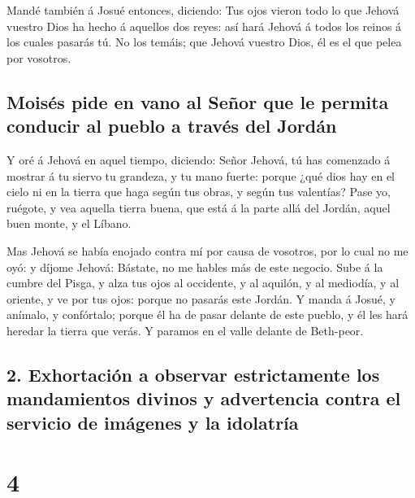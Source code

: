  Mandé también á Josué entonces, diciendo: Tus ojos
vieron todo lo que Jehová vuestro Dios ha hecho á aquellos dos reyes:
así hará Jehová á todos los reinos á los cuales pasarás tú.
 No los temáis; que Jehová vuestro Dios, él es el que
pelea por vosotros.

\hypertarget{moisuxe9s-pide-en-vano-al-seuxf1or-que-le-permita-conducir-al-pueblo-a-travuxe9s-del-jorduxe1n}{%
\subsection{Moisés pide en vano al Señor que le permita conducir al
pueblo a través del
Jordán}\label{moisuxe9s-pide-en-vano-al-seuxf1or-que-le-permita-conducir-al-pueblo-a-travuxe9s-del-jorduxe1n}}

 Y oré á Jehová en aquel tiempo, diciendo:
 Señor Jehová, tú has comenzado á mostrar á tu siervo tu
grandeza, y tu mano fuerte: porque ¿qué dios hay en el cielo ni en la
tierra que haga según tus obras, y según tus valentías? 
Pase yo, ruégote, y vea aquella tierra buena, que está á la parte allá
del Jordán, aquel buen monte, y el Líbano.

 Mas Jehová se había enojado contra mí por causa de
vosotros, por lo cual no me oyó: y díjome Jehová: Bástate, no me hables
más de este negocio.  Sube á la cumbre del Pisga, y alza
tus ojos al occidente, y al aquilón, y al mediodía, y al oriente, y ve
por tus ojos: porque no pasarás este Jordán.  Y manda á
Josué, y anímalo, y confórtalo; porque él ha de pasar delante de este
pueblo, y él les hará heredar la tierra que verás.  Y
paramos en el valle delante de Beth-peor.

\hypertarget{exhortaciuxf3n-a-observar-estrictamente-los-mandamientos-divinos-y-advertencia-contra-el-servicio-de-imuxe1genes-y-la-idolatruxeda}{%
\subsection{2. Exhortación a observar estrictamente los mandamientos
divinos y advertencia contra el servicio de imágenes y la
idolatría}\label{exhortaciuxf3n-a-observar-estrictamente-los-mandamientos-divinos-y-advertencia-contra-el-servicio-de-imuxe1genes-y-la-idolatruxeda}}

\hypertarget{section-3}{%
\section{4}\label{section-3}}

